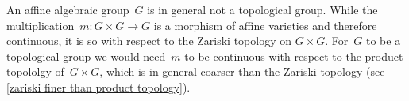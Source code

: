 \begin{warning}
  An affine algebraic group~$G$ is in general not a topological group.
  While the multiplication~$m \colon G \times G \to G$ is a morphism of affine varieties and therefore continuous, it is so with respect to the Zariski topology on $G \times G$.
  For~$G$ to be a topological group we would need~$m$ to be continuous with respect to the product topololgy of~$G \times G$, which is in general coarser than the Zariski topology (see \cref{zariski finer than product topology}).
\end{warning}











% 
% 
% 
% 
% 
